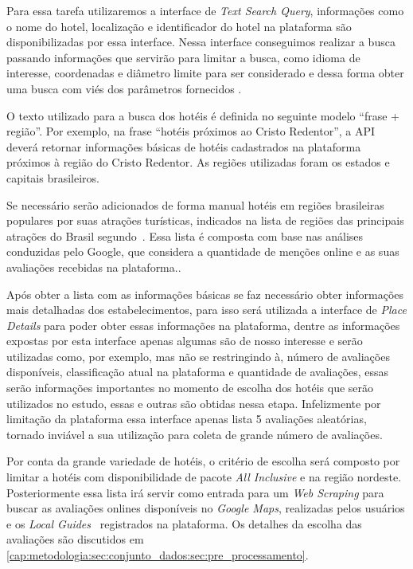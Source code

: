 Para essa tarefa utilizaremos a interface de \emph{Text Search Query}, informações como o nome do hotel, localização e identificador do hotel na plataforma são disponibilizadas por essa interface. Nessa interface conseguimos realizar a busca passando informações que servirão para limitar a busca, como idioma de interesse, coordenadas e diâmetro limite para ser considerado e dessa forma obter uma busca com viés dos parâmetros fornecidos \cite{placesSearchText2023}.



O texto utilizado para a busca dos hotéis é definida no seguinte modelo “frase + região”. Por exemplo, na frase “hotéis próximos ao Cristo Redentor”, a API deverá retornar informações básicas de hotéis cadastrados na plataforma próximos à região do Cristo Redentor. As regiões utilizadas foram os estados e capitais brasileiros.

Se necessário serão adicionados de forma manual hotéis em regiões brasileiras populares por suas atrações turísticas, indicados na lista de regiões das principais atrações do Brasil segundo~. Essa lista é composta com base nas análises conduzidas pelo Google, que considera a quantidade de menções online e as suas avaliações recebidas na plataforma..

Após obter a lista com as informações básicas se faz necessário obter informações mais detalhadas dos estabelecimentos, para isso será utilizada a interface de \emph{Place Details} para poder obter essas informações na plataforma, dentre as informações expostas por esta interface apenas algumas são de nosso interesse e serão utilizadas como, por exemplo, mas não se restringindo à, número de avaliações disponíveis, classificação atual na plataforma e quantidade de avaliações, essas serão informações importantes no momento de escolha dos hotéis que serão utilizados no estudo, essas e outras são obtidas nessa etapa. Infelizmente por limitação da plataforma essa interface apenas lista 5 avaliações aleatórias, tornado inviável a sua utilização para coleta de grande número de avaliações.



Por conta da grande variedade de hotéis, o critério de escolha será composto por limitar a hotéis com disponibilidade de pacote \emph{All Inclusive} e na região nordeste. Posteriormente essa lista irá servir como entrada para um \emph{Web Scraping} para buscar as avaliações onlines disponíveis no \textit{Google Maps}, realizadas pelos usuários e os \emph{Local Guides}~\cite{google2022localguides} registrados na plataforma. Os detalhes da escolha das avaliações são discutidos em \ref{cap:metodologia:sec:conjunto_dados:sec:pre_processamento}.

